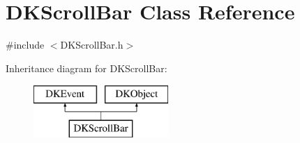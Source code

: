 \hypertarget{class_d_k_scroll_bar}{\section{D\-K\-Scroll\-Bar Class Reference}
\label{class_d_k_scroll_bar}
}


{\ttfamily \#include $<$D\-K\-Scroll\-Bar.\-h$>$}

Inheritance diagram for D\-K\-Scroll\-Bar\-:\begin{figure}[H]
\begin{center}
\leavevmode
\includegraphics[height=2.000000cm]{class_d_k_scroll_bar}
\end{center}
\end{figure}
